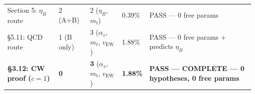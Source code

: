 \documentclass[
  11pt,
]{article}
\begin{document}
\begin{longtable}[]{@{}lllll@{}}
\begin{minipage}[t]{0.17\columnwidth}\raggedright
Section 5: \(\eta_B\) route\strut
\end{minipage} & \begin{minipage}[t]{0.17\columnwidth}\raggedright
2 (A+B)\strut
\end{minipage} & \begin{minipage}[t]{0.17\columnwidth}\raggedright
2 (\(\eta_B\), \(m_t\))\strut
\end{minipage} & \begin{minipage}[t]{0.17\columnwidth}\raggedright
0.39\%\strut
\end{minipage} & \begin{minipage}[t]{0.17\columnwidth}\raggedright
PASS --- 0 free params\strut
\end{minipage}\tabularnewline
\begin{minipage}[t]{0.17\columnwidth}\raggedright
§5.11: QCD route\strut
\end{minipage} & \begin{minipage}[t]{0.17\columnwidth}\raggedright
1 (B only)\strut
\end{minipage} & \begin{minipage}[t]{0.17\columnwidth}\raggedright
3 (\(\alpha_s\), \(m_t\), \(v_{\text{EW}}\))\strut
\end{minipage} & \begin{minipage}[t]{0.17\columnwidth}\raggedright
1.88\%\strut
\end{minipage} & \begin{minipage}[t]{0.17\columnwidth}\raggedright
PASS --- 0 free params + predicts \(\eta_B\)\strut
\end{minipage}\tabularnewline
\begin{minipage}[t]{0.17\columnwidth}\raggedright
\textbf{§3.12: CW proof (\(c=1\))}\strut
\end{minipage} & \begin{minipage}[t]{0.17\columnwidth}\raggedright
\textbf{0}\strut
\end{minipage} & \begin{minipage}[t]{0.17\columnwidth}\raggedright
\textbf{3} (\(\alpha_s\), \(m_t\), \(v_{\text{EW}}\))\strut
\end{minipage} & \begin{minipage}[t]{0.17\columnwidth}\raggedright
\textbf{1.88\%}\strut
\end{minipage} & \begin{minipage}[t]{0.17\columnwidth}\raggedright
\textbf{PASS --- COMPLETE --- 0 hypotheses, 0 free params}\strut

\end{minipage}
\end{longtable}
\end{document}
